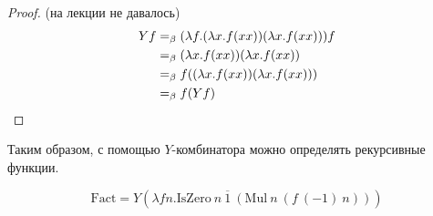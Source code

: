 \begin{proof} (на лекции не давалось)
    \begin{align*}
        Yf &=_{\beta} (\lambda f . (\lambda x . f (x x)) (\lambda x . f (x x))) f \\
           &=_{\beta} (\lambda x . f (x x)) (\lambda x . f (x x)) \\
           &=_{\beta} f ((\lambda x . f (x x)) (\lambda x . f (x x))) \\
           &=_{\beta} f (Y f)
    \qedhere
    \end{align*}
\end{proof}

Таким образом, с помощью $Y$-комбинатора можно определять рекурсивные функции.
\begin{example}
    \[
        \mathrm{Fact} = Y (\lambda{} f n . \mathrm{IsZero}\ n\ \overline{1}\ (\mathrm{Mul}\ n\ (f\ (-1)\ n)))
    \]
\end{example}

\todo %
